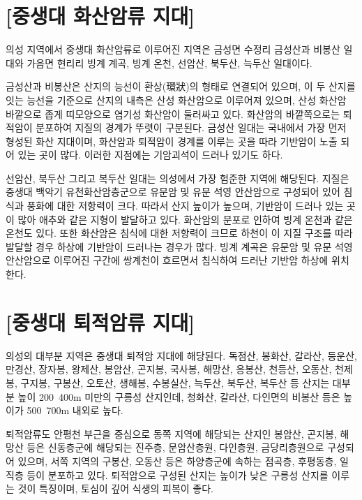 \documentclass[12pt,a4paper]{book}
\newcommand{\SectionMargin}			{\newpage  \null \vskip 0cm}
\begin{document}
	\SectionMargin
	\section{[중생대 화산암류 지대]}
	\null


의성 지역에서 중생대 화산암류로 이루어진 지역은 금성면 수정리 금성산과 비봉산 일대와 가음면 현리리 빙계 계곡, 빙계 온천, 선암산, 북두산, 늑두산 일대이다.

금성산과 비봉산은 산지의 능선이 환상(環狀)의 형태로 연결되어 있으며, 이 두 산지를 잇는 능선을 기준으로 산지의 내측은 산성 화산암으로 이루어져 있으며, 산성 화산암 바깥으로 좁게 띠모양으로 염기성 화산암이 둘러싸고 있다. 화산암의 바깥쪽으로는 퇴적암이 분포하여 지질의 경계가 뚜렷이 구분된다. 금성산 일대는 국내에서 가장 먼저 형성된 화산 지대이며, 화산암과 퇴적암이 경계를 이루는 곳을 따라 기반암이 노출 되어 있는 곳이 많다. 이러한 지점에는 기암괴석이 드러나 있기도 하다.

선암산, 북두산 그리고 복두산 일대는 의성에서 가장 험준한 지역에 해당된다. 지질은 중생대 백악기 유천화산암층군으로 유문암 및 유문 석영 안산암으로 구성되어 있어 침식과 풍화에 대한 저항력이 크다. 따라서 산지 높이가 높으며, 기반암이 드러나 있는 곳이 많아 애추와 같은 지형이 발달하고 있다. 화산암의 분포로 인하여 빙계 온천과 같은 온천도 있다. 또한 화산암은 침식에 대한 저항력이 크므로 하천이 이 지질 구조를 따라 발달할 경우 하상에 기반암이 드러나는 경우가 많다. 빙계 계곡은 유문암 및 유문 석영 안산암으로 이루어진 구간에 쌍계천이 흐르면서 침식하여 드러난 기반암 하상에 위치한다.



	\SectionMargin
	\section{[중생대 퇴적암류 지대]}
	\null


의성의 대부분 지역은 중생대 퇴적암 지대에 해당된다. 독점산, 봉화산, 갈라산, 등운산, 만경산, 장자봉, 왕제산, 봉암산, 곤지봉, 국사봉, 해망산, 응봉산, 천등산, 오동산, 천제봉, 구지봉, 구봉산, 오토산, 생해봉, 수봉실산, 늑두산, 북두산, 복두산 등 산지는 대부분 높이 200~400m 미만의 구릉성 산지인데, 청화산, 갈라산, 다인면의 비봉산 등은 높이가 500~700m 내외로 높다.

퇴적암류도 안평천 부근을 중심으로 동쪽 지역에 해당되는 산지인 봉암산, 곤지봉, 해망산 등은 신동층군에 해당되는 진주층, 문암산층원, 다인층원, 금당리층원으로 구성되어 있으며, 서쪽 지역의 구봉산, 오동산 등은 하양층군에 속하는 점곡층, 후평동층, 일직층 등이 분포하고 있다. 퇴적암으로 구성된 산지는 높이가 낮은 구릉성 산지를 이루는 것이 특징이며, 토심이 깊어 식생의 피복이 좋다.
\end{document}

